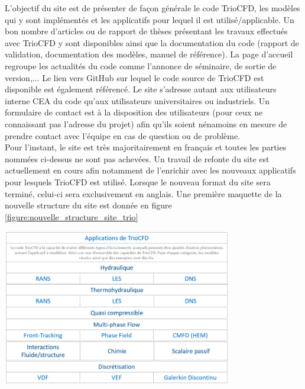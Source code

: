 L'objectif du site est de pr\'esenter de fa\c con g\'en\'erale le code TrioCFD, les mod\`eles qui y sont impl\'ement\'es et les applicatifs pour lequel il est utilis\'e/applicable. Un bon nombre d'articles ou de rapport de th\`eses pr\'esentant les travaux effectu\'es avec TrioCFD y sont disponibles ainsi que la documentation du code (rapport de validation, documentation des mod\`eles, manuel de r\'ef\'erence). La page d'accueil regroupe les actualit\'es du code comme l'annonce de s\'eminaire, de sortie de version,... Le lien vers GitHub sur lequel le code source de TrioCFD est disponible est \'egalement r\'ef\'erenc\'e.\newline
Le site s'adresse autant aux utilisateurs interne CEA du code qu'aux utilisateurs universitaires ou industriels. Un formulaire de contact est à la disposition des utilisateurs (pour ceux ne connaissant pas l'adresse du projet) afin qu'ils soient n\'enamoins en mesure de prendre contact avec l'\'equipe en cas de question ou de problème.\newline\\
Pour l'instant, le site est tr\`es majoritairement en fran\c cais et toutes les parties nomm\'ees ci-dessus ne sont pas achev\'ees. Un travail de refonte du site est actuellement en cours afin notamment de l'enrichir avec les nouveaux applicatifs pour lesquels TrioCFD est utilis\'e. Lorsque le nouveau format du site sera termin\'e, celui-ci sera
exclusivement en anglais. Une premi\`ere maquette de la nouvelle structure du site est donn\'ee en figure \ref{figure:nouvelle_structure_site_trio}

\begin{center}
\includegraphics[width=10cm]{pictures/nouveau_site_trio.png}
\end{center}
\begin{center}
\end{center}

